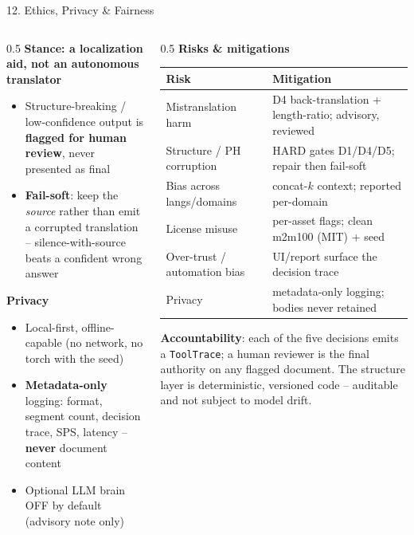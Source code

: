 \documentclass[10pt,aspectratio=169]{beamer}
\begin{document}
\begin{frame}{12. Ethics, Privacy \& Fairness}
\begin{columns}[T]
\begin{column}{0.5\textwidth}
\textbf{Stance: a localization aid, not an autonomous translator}
\begin{itemize}\small
  \item Structure-breaking / low-confidence output is \textbf{flagged for human review}, never presented as final
  \item \textbf{Fail-soft}: keep the \emph{source} rather than emit a corrupted translation -- silence-with-source beats a confident wrong answer
\end{itemize}

\textbf{Privacy}
\begin{itemize}\small
  \item Local-first, offline-capable (no network, no torch with the seed)
  \item \textbf{Metadata-only} logging: format, segment count, decision trace, SPS, latency -- \textbf{never} document content
  \item Optional LLM brain OFF by default (advisory note only)
\end{itemize}
\end{column}
\begin{column}{0.5\textwidth}
\textbf{Risks \& mitigations}
\begin{table}[h]
\centering\tiny
\begin{tabular}{ll}
\toprule
\textbf{Risk} & \textbf{Mitigation} \\
\midrule
Mistranslation harm & D4 back-translation + length-ratio; advisory, reviewed \\
Structure / PH corruption & HARD gates D1/D4/D5; repair then fail-soft \\
Bias across langs/domains & concat-$k$ context; reported per-domain \\
License misuse & per-asset flags; clean m2m100 (MIT) + seed \\
Over-trust / automation bias & UI/report surface the decision trace \\
Privacy & metadata-only logging; bodies never retained \\
\bottomrule
\end{tabular}
\end{table}
\scriptsize \textbf{Accountability}: each of the five decisions emits a \texttt{ToolTrace}; a human reviewer is the final authority on any flagged document. The structure layer is deterministic, versioned code -- auditable and not subject to model drift.
\end{column}
\end{columns}
\end{frame}
\end{document}
